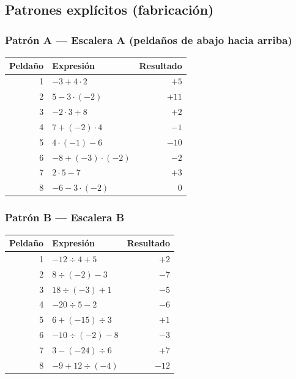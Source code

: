 \documentclass[12pt, letterpaper]{article}
\begin{document}
\subsection{Patrones explícitos (fabricación)}

\subsubsection{Patrón A — Escalera A (peldaños de abajo hacia arriba)}

\begin{center}
\small
\begin{tabular}{@{}r l r@{}}
\toprule
\textbf{Peldaño} & \textbf{Expresión} & \textbf{Resultado}\\
\midrule
1 & $-3+4\cdot 2$ & $+5$\\
2 & $5-3\cdot(-2)$ & $+11$\\
3 & $-2\cdot 3+8$ & $+2$\\
4 & $7+(-2)\cdot 4$ & $-1$\\
5 & $4\cdot(-1)-6$ & $-10$\\
6 & $-8+(-3)\cdot(-2)$ & $-2$\\
7 & $2\cdot 5-7$ & $+3$\\
8 & $-6-3\cdot(-2)$ & $0$\\
\bottomrule
\end{tabular}
\end{center}

\subsubsection{Patrón B — Escalera B}

\begin{center}
\small
\begin{tabular}{@{}r l r@{}}
\toprule
\textbf{Peldaño} & \textbf{Expresión} & \textbf{Resultado}\\
\midrule
1 & $-12\div 4+5$ & $+2$\\
2 & $8\div(-2)-3$ & $-7$\\
3 & $18\div(-3)+1$ & $-5$\\
4 & $-20\div 5-2$ & $-6$\\
5 & $6+(-15)\div 3$ & $+1$\\
6 & $-10\div(-2)-8$ & $-3$\\
7 & $3-(-24)\div 6$ & $+7$\\
8 & $-9+12\div(-4)$ & $-12$\\
\bottomrule
\end{tabular}
\end{center}
\end{document}
